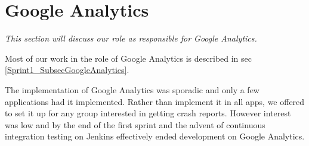 \section{Google Analytics} \label{Roles_SecAnalytics}
\textit{This section will discuss our role as responsible for Google Analytics.}

Most of our work in the role of Google Analytics is described in sec \ref{Sprint1_SubsecGoogleAnalytics}.

The implementation of Google Analytics was sporadic and only a few applications had it implemented. Rather than implement it in all apps, we offered to set it up for any group interested in getting crash reports. However interest was low and by the end of the first sprint and the advent of continuous integration testing on Jenkins effectively ended development on Google Analytics.